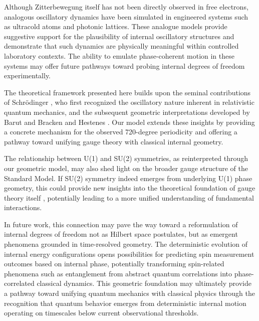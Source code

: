 \documentclass[%
 reprint,
 amsmath,amssymb,
 aps,
]{revtex4-1}
\numberwithin{equation}{section}%
\begin{document}
Although Zitterbewegung itself has not been directly observed in free electrons, analogous oscillatory dynamics have been simulated in engineered systems such as ultracold atoms and photonic lattices. These analogue models provide suggestive support for the plausibility of internal oscillatory structures and demonstrate that such dynamics are physically meaningful within controlled laboratory contexts. The ability to emulate phase-coherent motion in these systems may offer future pathways toward probing internal degrees of freedom experimentally.

The theoretical framework presented here builds upon the seminal contributions of Schrödinger \cite{schrodinger1930}, who first recognized the oscillatory nature inherent in relativistic quantum mechanics, and the subsequent geometric interpretations developed by Barut and Bracken \cite{barut1981} and Hestenes \cite{hestenes1990}. Our model extends these insights by providing a concrete mechanism for the observed 720-degree periodicity and offering a pathway toward unifying gauge theory with classical internal geometry.

The relationship between U(1) and SU(2) symmetries, as reinterpreted through our geometric model, may also shed light on the broader gauge structure of the Standard Model. If SU(2) symmetry indeed emerges from underlying U(1) phase geometry, this could provide new insights into the theoretical foundation of gauge theory itself \cite{utiyama1956}, potentially leading to a more unified understanding of fundamental interactions.

In future work, this connection may pave the way toward a reformulation of internal degrees of freedom not as Hilbert space postulates, but as emergent phenomena grounded in time-resolved geometry. The deterministic evolution of internal energy configurations opens possibilities for predicting spin measurement outcomes based on internal phase, potentially transforming spin-related phenomena such as entanglement from abstract quantum correlations into phase-correlated classical dynamics. This geometric foundation may ultimately provide a pathway toward unifying quantum mechanics with classical physics through the recognition that quantum behavior emerges from deterministic internal motion operating on timescales below current observational thresholds.
\end{document}
